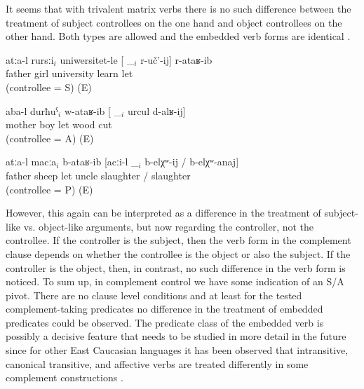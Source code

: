 It seems that with trivalent matrix verbs there is no such difference between the treatment of subject controllees on the one hand and object controllees on the other hand. Both types are allowed and the embedded verb forms are identical . 
%
\begin{exe}
	
		\ex	\label{ex:Father sent the daughter to the university to study@47a}
		\gll	atːa-l	rursːi$_{i}$	uniwersitet-le	[ \_$_{i}$	r-uč'-ij]	r-ataʁ-ib\\
			father	girl	university	{} 	\tsc{f-}learn	let\\
		\glt	{} (controllee = S) (E)

		\ex	\label{ex:Mother sent the son to cut firewood@47b}
		\gll	aba-l	durħuˁ$_{i}$	w-ataʁ-ib	[ \_$_{i}$	urcul	d-alʁ-ij]\\
			mother	boy	let	{}  	wood	cut\\
		\glt	{} (controllee = A) (E)

		\ex	\label{ex:Father sent the sheep in order to be slaughtered by the uncle@47c}
		\gll	atːa-l	macːa$_{i}$	b-ataʁ-ib	[acːi-l	\_$_{i}$	b-elχʷ-ij	/	b-elχʷ-anaj]\\
			father	sheep	let	uncle		slaughter	/ slaughter\\
		\glt	{} (controllee = P) (E)
	
\end{exe}

However, this again can be interpreted as a difference in the treatment of subject-like vs. object-like arguments, but now regarding the controller, not the controllee. If the controller is the subject, then the verb form in the complement clause depends on whether the controllee is the object or also the subject. If the controller is the object, then, in contrast, no such difference in the verb form is noticed. To sum up, in complement control we have some indication of an S/A pivot. There are no clause level conditions and at least for the tested complement-taking predicates no difference in the treatment of embedded predicates could be observed. The predicate class of the embedded verb is possibly a decisive feature that needs to be studied in more detail in the future since for other East Caucasian languages it has been observed that intransitive, canonical transitive, and affective verbs are treated differently in some complement constructions  \citep{Kibrik2003}.

